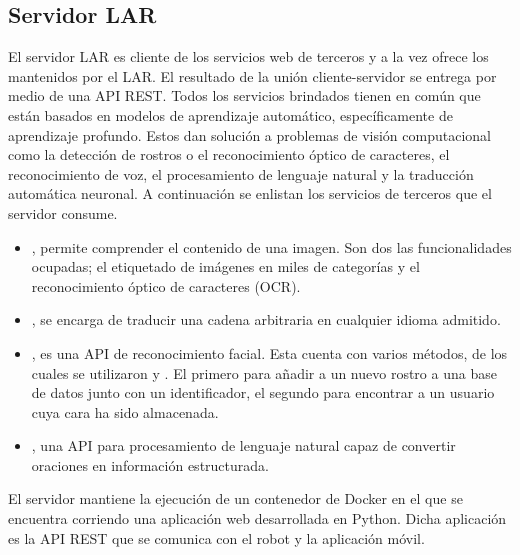 


\subsection{Servidor LAR}
\label{\detokenize{chapter_two/desc_cloudnao:servidor-lar}}
El servidor LAR es cliente de los servicios web de terceros y a la vez
ofrece los mantenidos por el LAR.
El resultado de la unión cliente-servidor se
entrega por medio de una
API REST.
Todos los servicios brindados tienen en común que están basados en modelos de
aprendizaje automático, específicamente de aprendizaje profundo. Estos dan solución
a problemas de visión computacional como la detección de rostros o el
reconocimiento óptico de caracteres, el reconocimiento
de voz, el procesamiento de lenguaje natural y la traducción automática
neuronal. A continuación se enlistan los servicios de terceros que el servidor
consume.
\begin{itemize}
\item {} 
, permite comprender el contenido de una imagen. Son dos las funcionalidades ocupadas; el etiquetado de imágenes en miles de categorías y el reconocimiento óptico de caracteres (OCR).


\item {} 
, se encarga de traducir una cadena arbitraria en cualquier idioma admitido.

\item {} 
, es una API de reconocimiento facial. Esta cuenta con varios métodos, de los cuales se utilizaron  y . El primero para añadir a un nuevo rostro a una base de datos junto con un identificador, el segundo para encontrar a un usuario cuya cara ha sido almacenada.

\item {} 
, una API para procesamiento de lenguaje natural capaz de convertir oraciones en información estructurada.

\end{itemize}

El servidor mantiene la ejecución de un contenedor de
Docker en el que se encuentra corriendo una aplicación web desarrollada en Python.
Dicha aplicación es la API REST que se comunica con el robot y la aplicación móvil.


